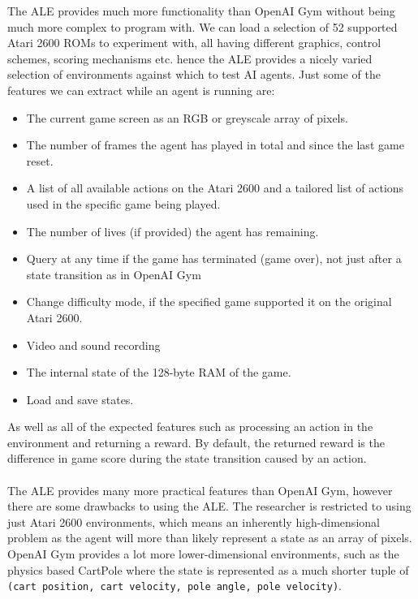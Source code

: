 The ALE provides much more functionality than OpenAI Gym without being much more complex to program with. We can load a selection of 52 supported Atari 2600 ROMs to experiment with, all having different graphics, control schemes, scoring mechanisms etc. hence the ALE provides a nicely varied selection of environments against which to test AI agents. Just some of the features we can extract while an agent is running are:
\begin{itemize}
    \item The current game screen as an RGB or greyscale array of pixels.
    \item The number of frames the agent has played in total and since the last game reset.
    \item A list of all available actions on the Atari 2600 and a tailored list of actions used in the specific game being played.
    \item The number of lives (if provided) the agent has remaining.
    \item Query at any time if the game has terminated (game over), not just after a state transition as in OpenAI Gym
    \item Change difficulty mode, if the specified game supported it on the original Atari 2600.
    \item Video and sound recording
    \item The internal state of the 128-byte RAM of the game.
    \item Load and save states.
\end{itemize}

As well as all of the expected features such as processing an action in the environment and returning a reward. By default, the returned reward is the difference in game score during the state transition caused by an action. \paragraph{}

The ALE provides many more practical features than OpenAI Gym, however there are some drawbacks to using the ALE. The researcher is restricted to using just Atari 2600 environments, which means an inherently high-dimensional problem as the agent will more than likely represent a state as an array of pixels. OpenAI Gym provides a lot more lower-dimensional environments, such as the physics based CartPole where the state is represented as a much shorter tuple of \texttt{(cart position, cart velocity, pole angle, pole velocity)}.
